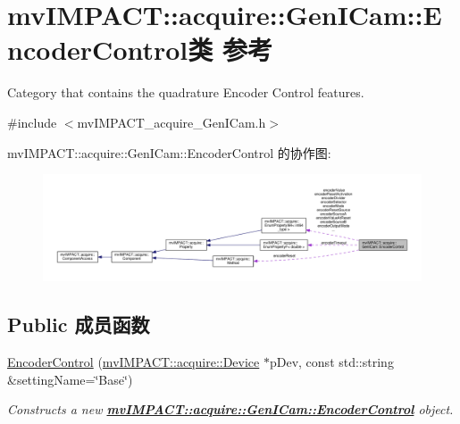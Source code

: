 \hypertarget{classmv_i_m_p_a_c_t_1_1acquire_1_1_gen_i_cam_1_1_encoder_control}{\section{mv\+I\+M\+P\+A\+C\+T\+:\+:acquire\+:\+:Gen\+I\+Cam\+:\+:Encoder\+Control类 参考}
\label{classmv_i_m_p_a_c_t_1_1acquire_1_1_gen_i_cam_1_1_encoder_control}
}


Category that contains the quadrature Encoder Control features.  




{\ttfamily \#include $<$mv\+I\+M\+P\+A\+C\+T\+\_\+acquire\+\_\+\+Gen\+I\+Cam.\+h$>$}



mv\+I\+M\+P\+A\+C\+T\+:\+:acquire\+:\+:Gen\+I\+Cam\+:\+:Encoder\+Control 的协作图\+:
\nopagebreak
\begin{figure}[H]
\begin{center}
\leavevmode
\includegraphics[width=350pt]{classmv_i_m_p_a_c_t_1_1acquire_1_1_gen_i_cam_1_1_encoder_control__coll__graph}
\end{center}
\end{figure}
\subsection*{Public 成员函数}
\begin{DoxyCompactItemize}
\item 
\hyperlink{classmv_i_m_p_a_c_t_1_1acquire_1_1_gen_i_cam_1_1_encoder_control_a33339c7f0b709d90dfdad3be7c0b6c37}{Encoder\+Control} (\hyperlink{classmv_i_m_p_a_c_t_1_1acquire_1_1_device}{mv\+I\+M\+P\+A\+C\+T\+::acquire\+::\+Device} $\ast$p\+Dev, const std\+::string \&setting\+Name=\char`\"{}Base\char`\"{})
\begin{DoxyCompactList}\small\item\em Constructs a new {\bfseries \hyperlink{classmv_i_m_p_a_c_t_1_1acquire_1_1_gen_i_cam_1_1_encoder_control}{mv\+I\+M\+P\+A\+C\+T\+::acquire\+::\+Gen\+I\+Cam\+::\+Encoder\+Control}} object. \end{DoxyCompactList}\end{DoxyCompactItemize}
